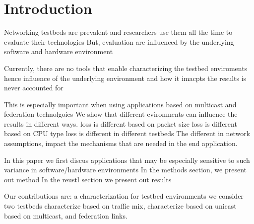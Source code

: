 \section{Introduction} 
\label{sec:intro} 

Networking testbeds are prevalent 
and researchers use them all the time 
to evaluate their technologies 
But, evaluation are influenced by the underlying software and hardware environment

Currently, there are no tools that enable characterizing the testbed 
 enviroments 
 hence influence of the underlying environment and how it imacpts the 
 results is never accounted for 
 
This is especially important when 
 using applications based on multicast and 
 federation technolgoies 
 We show that different evironments can influence the results in 
 different ways. 
 loss is different based on packet size 
 loss is different based on CPU type 
 loss is different in different testbeds 
The different in network assumptions, 
impact the mechanisms that are needed in the end application.  

In this paper we first discus applications that 
may be especially sensitive to such variance in software/hardware environments 
In the methods section, we present out method 
In the reustl section we present out results

Our contributions are: 
 a characterization for testbed environments 
 we consider two testbeds 
   characterize based on traffic mix, 
   characterize based on unicast 
   based on multicast, and federation links. 
   




